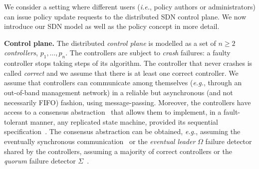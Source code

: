 \documentclass[11pt,pdftex,letter]{article}
\newcommand{\eg}{{\it e.g.}}
\newcommand{\ie}{{\it i.e.}}
\newcommand{\mcnote}[1]{\textcolor{heraldBlue}{\small \bf [MC: #1]}}
\newcommand{\ssnote}[1]{\textcolor{heraldBlue}{\small \bf [SS: #1]}}
\newcommand{\mcnote}[1]{}
\newcommand{\ssnote}[1]{}
\begin{document}
We consider a setting where different users (\ie, policy authors or administrators) can issue
policy update requests to the distributed SDN control plane.
We now introduce our SDN model as well as the policy concept in more detail.

%
\vspace{1mm}\noindent\textbf{Control plane.}
The distributed \emph{control plane} is modelled as a set of $n\geq 2$ \emph{controllers}, $p_1,\ldots,p_n$.
The controllers are subject to \emph{crash} failures: a
faulty controller stops taking steps of its algorithm.
The controller that never crashes is called \emph{correct} and we assume
that there is at least one correct controller.
We assume that controllers can communicate among themselves (\eg, through an out-of-band management network) in a reliable but asynchronous
(and not necessarily FIFO) fashion, using message-passing. Moreover,
the controllers have access to a consensus
abstraction~\cite{FLP85} that allows them to implement, in a fault-tolerant manner,
any replicated state machine, provided its sequential
specification~\cite{Her91}.
The consensus abstraction can be obtained, \eg, assuming
the eventually synchronous communication~\cite{DDS87} or
the \emph{eventual leader} $\Omega$ failure detector~\cite{CHT96}
shared by the controllers, assuming a majority of correct controllers
or the \emph{quorum} failure detector $\Sigma$~\cite{DFG10}.
\end{document}
